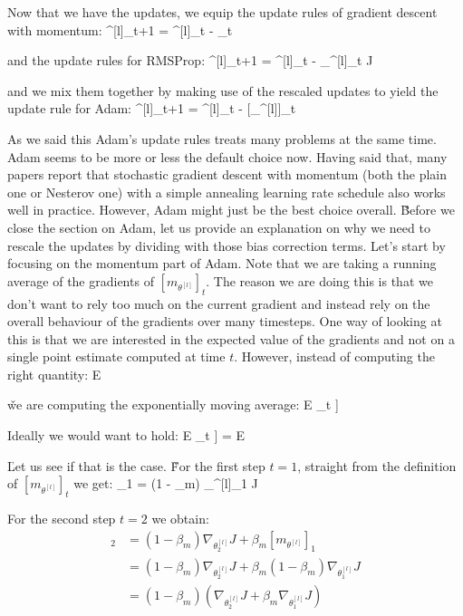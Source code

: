 Now that we have the updates, we equip the update rules of gradient descent
with momentum:
\bse
\theta^{[l]}_{t+1} = \theta^{[l]}_t - \alpha [m_{\theta^{[l]}}]_t
\ese

and the update rules for RMSProp:
\bse
\theta^{[l]}_{t+1} = \theta^{[l]}_t -  \nabla_{\theta^{[l]}_t} J
\ese

and we mix them together by making use of the rescaled updates to yield the update rule for Adam:
\bse
\theta^{[l]}_{t+1} = \theta^{[l]}_t -  [_{\theta^{[l]}}]_t
\ese

As we said this Adam's update rules treats many problems at the same time. Adam seems to be more or less the default
choice now. Having said that, many papers report that stochastic gradient descent with momentum (both the plain one
or Nesterov one) with a simple annealing learning rate schedule also works well in practice. However, Adam might just
be the best choice overall. \v

Before we close the section on Adam, let us provide an explanation on why we need to rescale the updates by dividing
with those bias correction terms. Let's start by focusing on the momentum part of Adam. Note that we are taking a
running average of the gradients of $[m_{\theta^{[l]}}]_t$. The reason we are doing this is that we don't want to
rely too much on the current gradient and instead rely on the overall behaviour of the gradients over many timesteps.
One way of looking at this is that we are interested in the expected value of the gradients and not on a single point
estimate computed at time $t$. However, instead of computing the right quantity:
\bse
E
\ese

\v

we are computing the exponentially moving average:
\bse
E \Big[ [m_{\theta^{[l]}}]_t \Big]
\ese

Ideally we would want to hold:
\bse
E \Big[ [m_{\theta^{[l]}}]_t \Big] = E
\ese

\v

Let us see if that is the case. \v

For the first step $t=1$, straight from the definition of $[m_{\theta^{[l]}}]_t $ we get:
\bse
[m_{\theta^{[l]}}]_1 = (1 - \beta_m) \nabla_{\theta^{[l]}_1} J
\ese

For the second step $t=2$ we obtain:
\begin{align*}
[m_{\theta^{[l]}}]_2 & = (1 - \beta_m) \nabla_{\theta^{[l]}_2} J + \beta_m [m_{\theta^{[l]}}]_{1} \\
&= (1 - \beta_m) \nabla_{\theta^{[l]}_2} J + \beta_m (1 - \beta_m) \nabla_{\theta^{[l]}_1} J \\
&= (1 - \beta_m) \left( \nabla_{\theta^{[l]}_2} J + \beta_m \nabla_{\theta^{[l]}_1} J \right)
\end{align*}

